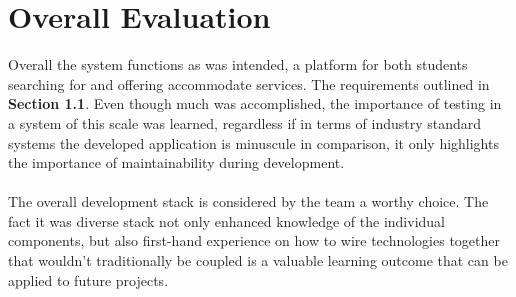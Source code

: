 \section{Overall Evaluation}
Overall the system functions as was intended, a platform for both students searching for and offering accommodate services. The requirements outlined in \textbf{Section 1.1}. Even though much was accomplished, the importance of testing in a system of this scale was learned, regardless if in terms of industry standard systems the developed application is minuscule in comparison, it only highlights the importance of maintainability during development.

\paragraph{}
The overall development stack is considered by the team a worthy choice. The fact it was diverse stack not only enhanced knowledge of the individual components, but also first-hand experience on how to wire technologies together that wouldn't traditionally be coupled is a valuable learning outcome that can be applied to future projects. 